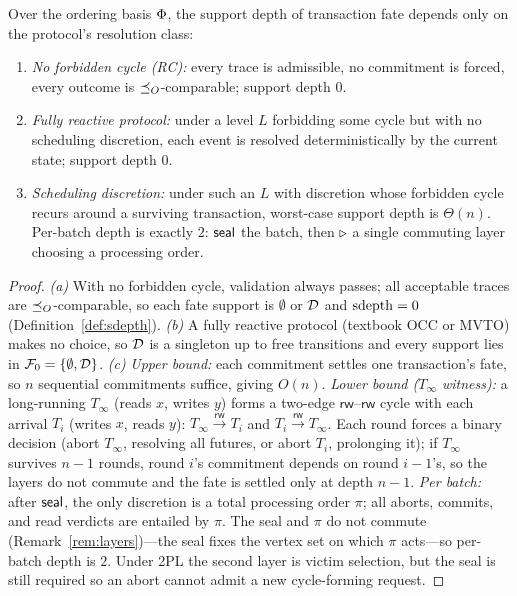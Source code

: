\begin{theorem}
  \label{thm:txn-depth}
  Over the ordering basis $\Phi$, the support depth of transaction fate
  depends only on the protocol's resolution class:
  \begin{enumerate}[nosep,label=(\alph*)]
    \item \emph{No forbidden cycle (RC):} every trace is admissible, no
          commitment is forced, every outcome is $\preceq_O$-comparable; support
          depth $0$.
    \item \emph{Fully reactive protocol:} under a level $L$ forbidding some
          cycle but with no scheduling discretion, each event is resolved
          deterministically by the current state; support depth $0$.
    \item \emph{Scheduling discretion:} under such an $L$ with discretion whose
          forbidden cycle recurs around a surviving transaction, worst-case
          support depth is $\Theta(n)$. Per-batch depth is exactly $2$:
          $\mathsf{seal}$ the batch, then $\mathbin{\triangleright}$ a single commuting layer choosing a
          processing order.
  \end{enumerate}
\end{theorem}
\begin{proof}
  \emph{(a)} With no forbidden cycle, validation always passes; all acceptable
  traces are $\preceq_O$-comparable, so each fate support is $\emptyset$ or $\mathcal{D}$
  and $\operatorname{sdepth} = 0$ (Definition~\ref{def:sdepth}).
  \emph{(b)} A fully reactive protocol (textbook OCC or MVTO) makes no choice,
  so $\mathcal{D}$ is a singleton up to free transitions and every support lies in
  $\mathcal F_0 = \{\emptyset,\mathcal{D}\}$.
  \emph{(c)} \emph{Upper bound:} each commitment settles one transaction's
  fate, so $n$ sequential commitments suffice, giving $O(n)$. \emph{Lower bound
  ($T_\infty$ witness):} a long-running $T_\infty$ (reads $x$, writes $y$) forms
  a two-edge $\mathsf{rw}$--$\mathsf{rw}$ cycle with each arrival $T_i$ (writes
  $x$, reads $y$): $T_\infty \xrightarrow{\mathsf{rw}} T_i$ and
  $T_i \xrightarrow{\mathsf{rw}} T_\infty$. Each round forces a binary decision
  (abort $T_\infty$, resolving all futures, or abort $T_i$, prolonging it); if
  $T_\infty$ survives $n{-}1$ rounds, round $i$'s commitment depends on round
  $i{-}1$'s, so the layers do not commute and the fate is settled only at depth
  $n{-}1$. \emph{Per batch:} after $\mathsf{seal}$, the only discretion is a total
  processing order $\pi$; all aborts, commits, and read verdicts are entailed by
  $\pi$. The seal and $\pi$ do not commute (Remark~\ref{rem:layers})---the seal
  fixes the vertex set on which $\pi$ acts---so per-batch depth is $2$. Under
  2PL the second layer is victim selection, but the seal is still required so an
  abort cannot admit a new cycle-forming request.
\end{proof}

